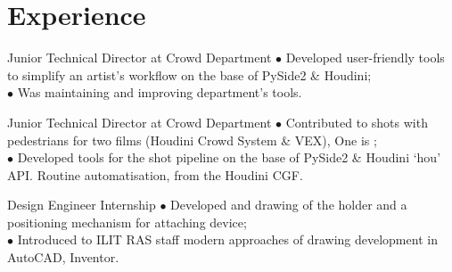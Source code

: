 \documentclass[]{cv-class}
\begin{document}
\begin{minipage}[t]{0.64\textwidth} 

\section{Experience}
    {}
    {Junior Technical Director at Crowd Department}
    {
    \textcolor{bullet_col}{$\bullet$} Developed user-friendly tools to simplify an artist's workflow on the base of PySide2 \& Houdini; \\
    \textcolor{bullet_col}{$\bullet$} Was maintaining and improving department's tools. \\
    }

    {}
    {Junior Technical Director at Crowd Department}
    {\textcolor{bullet_col}{$\bullet$} Contributed to shots with pedestrians for two films (Houdini Crowd System \& VEX), One is ; \\
    \textcolor{bullet_col}{$\bullet$} Developed tools for the shot pipeline on the base of PySide2 \& Houdini `hou' API. Routine automatisation,  from the Houdini CGF.
    \\
    }

    {}
    {Design Engineer Internship}
    {\textcolor{bullet_col}{$\bullet$} Developed  and drawing of the holder and a positioning mechanism for attaching device;\\
    \textcolor{bullet_col}{$\bullet$} Introduced to ILIT RAS staff modern approaches of drawing development in AutoCAD, Inventor.
    \\}



\end{minipage}
\end{document}
